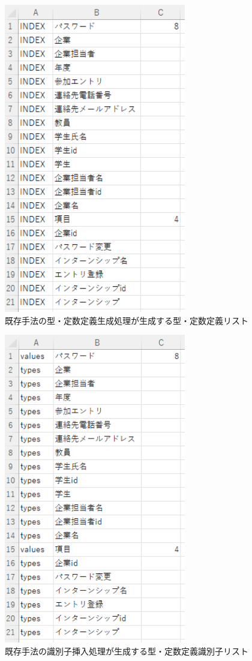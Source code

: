 \begin{figure}[tp]
    \begin{center}
        \includegraphics[width=300]{image/exis_katateisu_list.png}
        \caption{既存手法の型・定数定義生成処理が生成する型・定数定義リスト}
        \label{fig:exis_katateisu_list}
    \end{center}
\end{figure}

\begin{figure}[tp]
    \begin{center}
        \includegraphics[width=300]{image/exis_katateisu_id_list.PNG}
        \caption{既存手法の識別子挿入処理が生成する型・定数定義識別子リスト}
        \label{fig:exis_katateisu_id_list}
    \end{center}
\end{figure}



